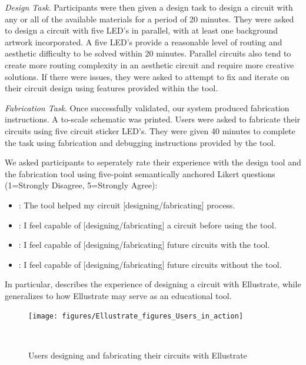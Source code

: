 \documentclass{sigchi}
\begin{document}
    \textit{Design Task}. Participants were then given a design task to design a circuit with any or all of the available materials for a period of 20 minutes. They were asked to design a circuit with five LED's in parallel, with at least one background artwork incorporated. A five LED's provide a reasonable level of routing and aesthetic difficulty to be solved within 20 minutes. Parallel circuits also tend to create more routing complexity in an aesthetic circuit and require more creative solutions. If there were issues, they were asked to attempt to fix and iterate on their circuit design using features provided within the tool. 

    \textit{Fabrication Task}. Once successfully validated, our system produced fabrication instructions. A to-scale schematic was printed. Users were asked to fabricate their circuits using five circuit sticker LED's. They were given 40 minutes to complete the task using fabrication and debugging instructions provided by the tool.  

    We asked participants to seperately rate their experience with the design tool and the fabrication tool using five-point semantically anchored Likert questions (1=Strongly Disagree, 5=Strongly Agree):
    \begin{itemize}
      \item {}: The tool helped my circuit [designing/fabricating] process.
      \item {}: I feel capable of [designing/fabricating] a circuit before using the tool.
      \item {}: I feel capable of [designing/fabricating] future circuits with the tool.
      \item {}: I feel capable of [designing/fabricating] future circuits without the tool.
    \end{itemize}
    In particular,  describes the experience of designing a circuit with Ellustrate, while  generalizes to how Ellustrate may serve as an educational tool.

\begin{figure}[h]
\centering
  \texttt{[image: figures/Ellustrate\_figures\_Users\_in\_action]}
  \caption{Users designing and fabricating their circuits with Ellustrate}~\label{fig:users-in-action}
  \vspace{-20pt}
\end{figure}
\end{document}
